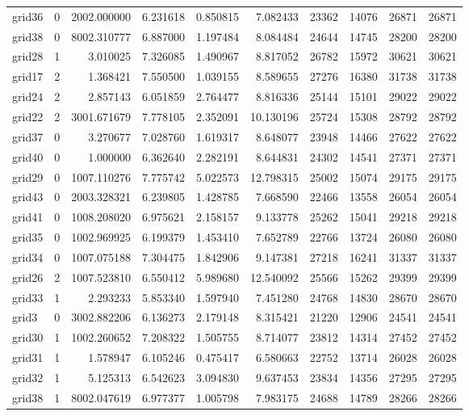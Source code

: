 \begin{longtable}{|l|r|r|r|r|r|r|r|r|r|}
grid36 & 0 & 2002.000000 & 6.231618 & 0.850815 & 7.082433 & 23362 & 14076 & 26871 & 26871 \\
grid38 & 0 & 8002.310777 & 6.887000 & 1.197484 & 8.084484 & 24644 & 14745 & 28200 & 28200 \\
grid28 & 1 & 3.010025 & 7.326085 & 1.490967 & 8.817052 & 26782 & 15972 & 30621 & 30621 \\
grid17 & 2 & 1.368421 & 7.550500 & 1.039155 & 8.589655 & 27276 & 16380 & 31738 & 31738 \\
grid24 & 2 & 2.857143 & 6.051859 & 2.764477 & 8.816336 & 25144 & 15101 & 29022 & 29022 \\
grid22 & 2 & 3001.671679 & 7.778105 & 2.352091 & 10.130196 & 25724 & 15308 & 28792 & 28792 \\
grid37 & 0 & 3.270677 & 7.028760 & 1.619317 & 8.648077 & 23948 & 14466 & 27622 & 27622 \\
grid40 & 0 & 1.000000 & 6.362640 & 2.282191 & 8.644831 & 24302 & 14541 & 27371 & 27371 \\
grid29 & 0 & 1007.110276 & 7.775742 & 5.022573 & 12.798315 & 25002 & 15074 & 29175 & 29175 \\
grid43 & 0 & 2003.328321 & 6.239805 & 1.428785 & 7.668590 & 22466 & 13558 & 26054 & 26054 \\
grid41 & 0 & 1008.208020 & 6.975621 & 2.158157 & 9.133778 & 25262 & 15041 & 29218 & 29218 \\
grid35 & 0 & 1002.969925 & 6.199379 & 1.453410 & 7.652789 & 22766 & 13724 & 26080 & 26080 \\
grid34 & 0 & 1007.075188 & 7.304475 & 1.842906 & 9.147381 & 27218 & 16241 & 31337 & 31337 \\
grid26 & 2 & 1007.523810 & 6.550412 & 5.989680 & 12.540092 & 25566 & 15262 & 29399 & 29399 \\
grid33 & 1 & 2.293233 & 5.853340 & 1.597940 & 7.451280 & 24768 & 14830 & 28670 & 28670 \\
grid3 & 0 & 3002.882206 & 6.136273 & 2.179148 & 8.315421 & 21220 & 12906 & 24541 & 24541 \\
grid30 & 1 & 1002.260652 & 7.208322 & 1.505755 & 8.714077 & 23812 & 14314 & 27452 & 27452 \\
grid31 & 1 & 1.578947 & 6.105246 & 0.475417 & 6.580663 & 22752 & 13714 & 26028 & 26028 \\
grid32 & 1 & 5.125313 & 6.542623 & 3.094830 & 9.637453 & 23834 & 14356 & 27295 & 27295 \\
grid38 & 1 & 8002.047619 & 6.977377 & 1.005798 & 7.983175 & 24688 & 14789 & 28266 & 28266 \\

\end{longtable}
